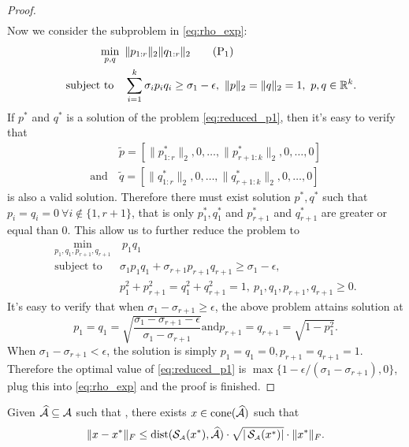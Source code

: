 \begin{proof}
\begin{align}
  \end{align}
  Now we consider the subproblem in \eqref{eq:rho_exp}: 
  \begin{align}
    \min_{p,q}\enspace & \| p_{1:r} \|_2 \| q_{1:r} \|_2 \label{eq:reduced_p1} \tag{P$_1$} \\
    \hbox{\quad subject to\quad} & \sum_{i=1}^{k} \sigma_i p_i q_i \geq \sigma_1 - \epsilon,~ \|p\|_2 = \|q\|_2 = 1, ~p,q \in \mathbb{R}^{ k }. \nonumber
  \end{align}
  If $p^*$ and $q^*$ is a solution of the problem \eqref{eq:reduced_p1}, then it's easy to verify that 
  \begin{align*}
    & \tilde{p} = \left[ \| p^*_{1:r} \|_2, 0,\ldots, \|p^*_{r+1:k}\|_2, 0, \ldots, 0 \right] \\ 
    \text{and} ~& \tilde{q} = \left[ \| q^*_{1:r} \|_2, 0,\ldots, \|q^*_{r+1:k}\|_2, 0, \ldots, 0 \right]
  \end{align*}
  is also a valid solution. Therefore there must exist solution $p^*, q^*$ such that $p_i = q_i = 0~\forall i \notin \{1, r+1\}$, that is only $p^*_1, q^*_1$ and $p^*_{r+1}$ and $q^*_{r+1}$ are greater or equal than 0. This allow us to further reduce the problem to
  \begin{align*}
    \min_{ p_1, q_1, p_{r+1}, q_{r+1} } &~  p_1 q_1 \\
    \text{subject to} & \sigma_1 p_1 q_1 + \sigma_{r+1} p_{r+1} q_{r+1} \geq \sigma_1 - \epsilon, \\
    & p_1^2 + p_{r+1}^2 = q_1^2 + q_{r+1}^2 = 1, ~p_1, q_1, p_{r+1}, q_{r+1} \geq 0. 
  \end{align*}
  It's easy to verify that when $\sigma_1 - \sigma_{r+1} \geq \epsilon$, the above problem attains solution at 
  \[
    p_1 = q_1 = \sqrt{\frac{\sigma_1 - \sigma_{r+1} - \epsilon}{ \sigma_1 - \sigma_{r+1} } } \text{and} p_{r+1} = q_{r+1} = \sqrt{1 - p_1^2}.
  \]
  When $\sigma_1 - \sigma_{r+1} < \epsilon$, the solution is simply $p_1 = q_1 = 0, p_{r+1}= q_{r+1} = 1$.
  Therefore the optimal value of \eqref{eq:reduced_p1} is $\max\{1 - \epsilon / ( \sigma_1 - \sigma_{r+1} ), 0\}$, plug this into \eqref{eq:rho_exp} and the proof is finished. 
\end{proof}

\begin{proposition} \label{prop:dist_to_sol}
    Given $\widehat{\mathcal{A}} \subseteq \mathcal{A}$ such that , there exists $ x \in \operatorname{cone} ( \widehat{\mathcal{A}} ) $ such that 
    \begin{equation}
            \| x - x^* \|_F \leq \operatorname{dist}( \operatorname{\mathcal{S}_{\scriptscriptstyle\mathcal{A}}}(x^*), \widehat{\mathcal{A}} )\cdot \sqrt{| \operatorname{\mathcal{S}_{\scriptscriptstyle\mathcal{A}}}(x^*) |} \cdot \| x^* \|_F.  \label{eq:dist_to_sol}
    \end{equation}
\end{proposition}

